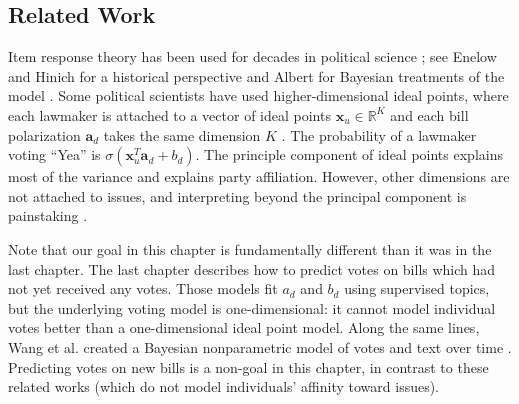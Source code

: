 


\subsection*{Related Work}

Item response theory has been used for decades in political science
\citep{clinton:2004,martin:2002,poole:1985}; see Enelow and Hinich for
a historical perspective \citep{enelow:1984} and Albert for Bayesian
treatments of the model \citep{albert:1992}.  Some political scientists
have used higher-dimensional ideal points, where each lawmaker is
attached to a vector of ideal points $\bm x_u \in \mathbb{R}^K$ and
each bill polarization $\bm a_d$ takes the same dimension $K$
\citep{heckman:1996}. The probability of a lawmaker voting ``Yea'' is
$\sigma(\bm x_u^T \bm a_d + b_d)$.  The principle component of ideal
points explains most of the variance and explains party affiliation.
However, other dimensions are not attached to issues, and
interpreting beyond the principal component is painstaking
\citep{jackman:2001}.

Note that our goal in this chapter is fundamentally different than it
was in the last chapter. The last chapter describes how to predict
votes on bills which had not yet received any votes.  Those models fit
$a_d$ and $b_d$ using supervised topics, but the underlying voting
model is one-dimensional: it cannot model individual votes better than
a one-dimensional ideal point model. Along the same lines, Wang et
al. created a Bayesian nonparametric model of votes and text over time
\citep{wang:2010}. Predicting votes on new bills is a non-goal in this
chapter, in contrast to these related works (which do not model
individuals' affinity toward issues).

